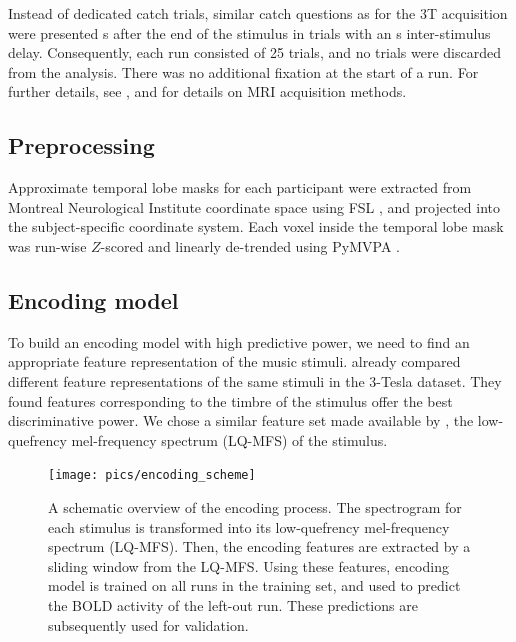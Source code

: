 Instead of dedicated catch trials, similar catch questions as for the 3T
acquisition were presented \unit[4]{s} after the end of the stimulus in trials
with an \unit[8]{s} inter-stimulus delay. Consequently, each run consisted of
25 trials, and no trials were discarded from the analysis.  There was no
additional fixation at the start of a run. For further details, see
\citet{HDH+2015}, and \citet{HBI+14} for details on MRI acquisition methods.


\subsection*{Preprocessing}

Approximate temporal lobe masks for each participant were extracted from
Montreal Neurological Institute coordinate space using FSL
\citep{SJB+04,JBB+12}, and projected into the subject-specific coordinate
system.  Each voxel inside the temporal lobe mask was run-wise $Z$-scored and
linearly de-trended using PyMVPA \citep{HHS09b}. 

\subsection*{Encoding model}

To build an encoding model with high predictive power, we need to find an
appropriate feature representation of the music stimuli.  \citet{CTK+2012}
already compared different feature representations of the same stimuli in the
3-Tesla dataset. They found features corresponding to the timbre of the
stimulus
offer the best discriminative power.  We chose a similar feature set made
available by \citet{HDH+2015}, the low-quefrency mel-frequency spectrum
(LQ-MFS) of the stimulus.

\begin{figure}
  \centering
  \texttt{[image: pics/encoding\_scheme]}

  \caption{A schematic overview of the encoding process. The spectrogram for
    each stimulus is transformed into its low-quefrency mel-frequency spectrum
    (LQ-MFS). Then, the encoding features are extracted by a sliding window
    from the LQ-MFS. Using these features, encoding model is trained on all
    runs in the training set, and used to predict the BOLD activity of the
  left-out run.  These predictions are subsequently used for validation.}

 \label{fig:encoding_scheme}
\end{figure}


